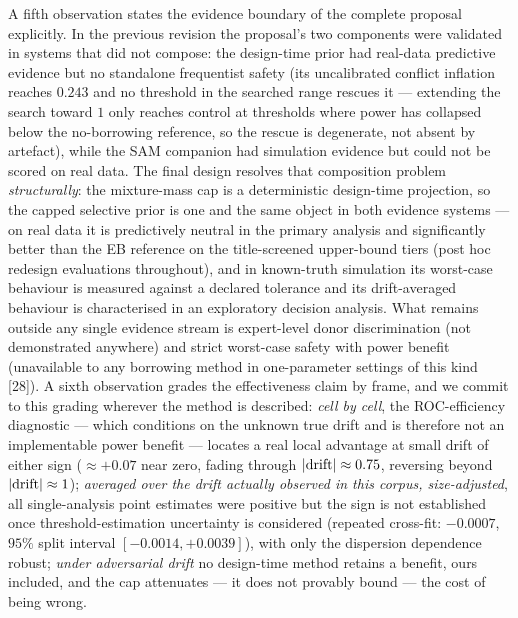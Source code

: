 \documentclass[11pt]{article}
\begin{document}
A fifth observation states the evidence boundary of the complete proposal
explicitly. In the previous revision the proposal's two components were
validated in systems that did not compose: the design-time prior had
real-data predictive evidence but no standalone frequentist safety (its
uncalibrated conflict inflation reaches $0.243$ and no threshold in the
searched range rescues it --- extending the search toward $1$ only reaches
control at thresholds where power has collapsed below the no-borrowing
reference, so the rescue is degenerate, not absent by artefact), while the
SAM companion had simulation evidence but could not be scored on real data.
The final design resolves that composition problem \emph{structurally}: the
mixture-mass cap is a deterministic design-time projection, so the capped
selective prior is one and the same object in both evidence systems --- on
real data it is predictively neutral in the primary analysis and
significantly better
than the EB reference on the title-screened upper-bound tiers (post hoc
redesign evaluations throughout), and in
known-truth simulation its worst-case behaviour is measured against a
declared tolerance and its drift-averaged behaviour is characterised in an
exploratory decision analysis. What
remains outside any single evidence stream is expert-level donor
discrimination (not demonstrated anywhere) and strict worst-case safety
with power benefit (unavailable to any borrowing method in one-parameter
settings of this kind [28]). A sixth
observation grades the effectiveness claim by frame, and we commit to this
grading wherever the method is described: \emph{cell by cell}, the
ROC-efficiency diagnostic --- which conditions on the unknown true drift
and is therefore not an implementable power benefit --- locates a real
local advantage at small drift of either sign ($\approx +0.07$ near zero,
fading through $|{\rm drift}| \approx 0.75$, reversing beyond
$|{\rm drift}| \approx 1$); \emph{averaged over the drift actually
observed in this corpus, size-adjusted}, all single-analysis point
estimates were positive but the sign is not established once
threshold-estimation uncertainty is considered (repeated cross-fit:
$-0.0007$, $95\%$ split interval $[-0.0014,+0.0039]$), with only the
dispersion dependence robust; \emph{under adversarial
drift} no design-time method retains a benefit, ours included, and the cap
attenuates --- it does not provably bound --- the cost
of being wrong.
\end{document}
